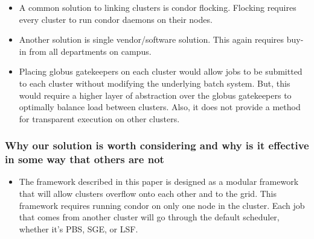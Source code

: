 \documentclass[11pt]{article}
\begin{document}
\begin{itemize}

\item 
A common solution to linking clusters is condor flocking.  Flocking requires every cluster to run condor daemons on their nodes.  

\item
Another solution is single vendor/software solution.  This again requires buy-in from all departments on campus.

\item
Placing globus gatekeepers on each cluster would allow jobs to be submitted to each cluster without modifying the underlying batch system.  But, this would require a higher layer of abstraction over the globus gatekeepers to optimally balance load between clusters.  Also, it does not provide a method for transparent execution on other clusters.



\end{itemize}


\subsubsection* {Why our solution is worth considering and why is it effective
in some way that others are not}

\begin{itemize}
\item The framework described in this paper is designed as a modular framework that will allow clusters overflow onto each other and to the grid.  This framework requires running condor on only one node in the cluster.  Each job that comes from another cluster will go through the default scheduler, whether it's PBS, SGE, or LSF.


\end{itemize}
\end{document}
